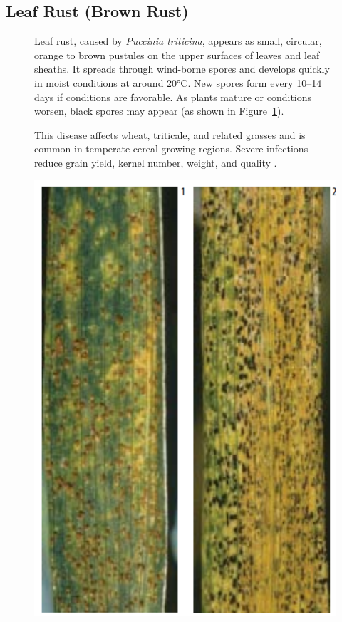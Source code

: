 \subsection{Leaf Rust (Brown Rust)} 

\begin{figure}[H]
    \centering
    \begin{minipage}{0.65\textwidth}
        
        Leaf rust, caused by \textit{Puccinia triticina}, appears as small, circular, orange to brown pustules on the upper surfaces of leaves and leaf sheaths. It spreads through wind-borne spores and develops quickly in moist conditions at around 20°C. New spores form every 10–14 days if conditions are favorable. As plants mature or conditions worsen, black spores may appear (as shown in Figure~\ref{fig:Figure03}). 
        
        This disease affects wheat, triticale, and related grasses and is common in temperate cereal-growing regions. Severe infections reduce grain yield, kernel number, weight, and quality \parencite{duveiller2012wheat}.
    \end{minipage}%
    \hfill
    \begin{minipage}{0.3\textwidth}
        \centering
        \includegraphics[width=0.6\linewidth]{chapters/chapter2/images/Figure03.png}
        
        \label{fig:Figure03}
    \end{minipage}
\end{figure}




